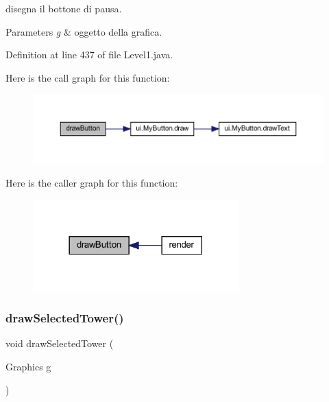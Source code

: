 disegna il bottone di pausa. 


\begin{DoxyParams}{Parameters}
{\em g} & oggetto della grafica. \\
\hline
\end{DoxyParams}


Definition at line 437 of file Level1.\+java.

Here is the call graph for this function\+:\nopagebreak
\begin{figure}[H]
\begin{center}
\leavevmode
\includegraphics[width=350pt]{classscenes_1_1_level1_a65768678909bc0512c6cb9780709ad38_cgraph}
\end{center}
\end{figure}
Here is the caller graph for this function\+:\nopagebreak
\begin{figure}[H]
\begin{center}
\leavevmode
\includegraphics[width=225pt]{classscenes_1_1_level1_a65768678909bc0512c6cb9780709ad38_icgraph}
\end{center}
\end{figure}
\mbox{\label{classscenes_1_1_level1_a0a97d0bb6d32640b2ae351707946abf7}} 
\subsubsection{\texorpdfstring{draw\+Selected\+Tower()}{drawSelectedTower()}}
{\footnotesize\ttfamily void draw\+Selected\+Tower (\begin{DoxyParamCaption}\item[{Graphics}]{g }\end{DoxyParamCaption})\hspace{0.3cm}{\ttfamily [private]}}



